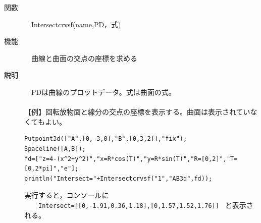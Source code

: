 \documentclass[papersize,a4paper,12pt,uplatex]{jsarticle}
\begin{document}
\begin{description}
\hypertarget{intersectcrvsf}{}
\item[関数]　Intersectcrvsf(name,PD，式)
\item[機能]　曲線と曲面の交点の座標を求める
\item[説明]　PDは曲線のプロットデータ。式は曲面の式。\\
　\\
【例】回転放物面と線分の交点の座標を表示する。曲面は表示されていなくてもよい。
\begin{verbatim}
Putpoint3d(["A",[0,-3,0],"B",[0,3,2]],"fix");
Spaceline([A,B]);
fd=["z=4-(x^2+y^2)","x=R*cos(T)","y=R*sin(T)","R=[0,2]","T=[0,2*pi]","e"];
println("Intersect="+Intersectcrvsf("1","AB3d",fd));
\end{verbatim}
実行すると，コンソールに\\
　　\verb|Intersect=[[0,-1.91,0.36,1.18],[0,1.57,1.52,1.76]] |
と表示される。\\


\end{description}
\end{document}
